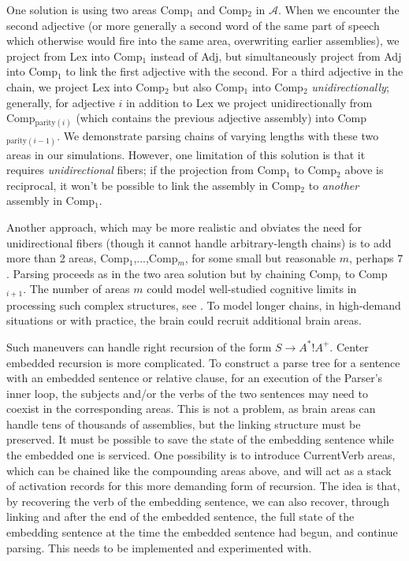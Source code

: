 \documentclass[11pt,a4paper]{article}
\begin{document}
One solution is using two areas {\sc Comp}$_1$ and {\sc Comp}$_2$ in $\mathcal{A}$. When we encounter the second adjective (or more generally a second word of the same part of speech which otherwise would fire into the same area, overwriting earlier assemblies), we project from {\sc Lex} into {\sc Comp}$_1$ instead of {\sc Adj}, but simultaneously project from {\sc Adj} into {\sc Comp}$_1$ to link the first adjective with the second. For a third adjective in the chain, we  project {\sc Lex} into {\sc Comp}$_2$ but also {\sc Comp}$_1$ into {\sc Comp}$_2$ {\em unidirectionally}; generally, for adjective $i$ in addition to {\sc Lex} we project unidirectionally from {\sc Comp}$_{\text{parity}(i)}$ (which contains the previous adjective assembly) into {\sc Comp}$_{\text{parity}(i-1)}$. We demonstrate parsing chains of varying lengths with these two areas in our simulations. However, one limitation of this solution is that it requires {\em unidirectional} fibers; if the projection from {\sc Comp}$_1$ to {\sc Comp}$_2$ above is reciprocal, it won't be possible to link the assembly in {\sc Comp}$_2$ to {\em another} assembly in {\sc Comp}$_1$.

Another approach, which may be more realistic and obviates the need for unidirectional fibers (though it cannot handle arbitrary-length chains) is to add more than 2 areas, {\sc Comp}$_1$,...,{\sc Comp}$_m$, for some small but reasonable $m$, perhaps $7$. Parsing proceeds as in the two area solution but by chaining {\sc Comp}$_i$ to {\sc Comp}$_{i+1}$. The number of areas $m$ could model well-studied cognitive limits in processing such complex structures, see \citet{GibsonEdward, karlsson}. To model longer chains, in high-demand situations or with practice, the brain could recruit additional brain areas.

Such maneuvers can handle right recursion of the form $S\rightarrow A^{*}!A^{+}$.  Center embedded recursion is more complicated. To construct a parse tree for a sentence with an embedded sentence or relative clause, for an execution of the Parser's inner loop, the subjects and/or the verbs of the two sentences may need to coexist in the corresponding areas.  This is not a problem, as brain areas can handle tens of thousands of assemblies, but the linking structure must be preserved.  It must be possible to save the state of the embedding sentence while the embedded one is serviced.  One possibility is to introduce {\sc CurrentVerb} areas, which can be chained like the compounding areas above, and will act as a stack of activation records for this more demanding form of recursion.  The idea is that, by recovering the verb of the embedding sentence, we can also recover, through linking and after the end of the embedded sentence, the full state of the embedding sentence at the time the embedded sentence had begun, and continue parsing.  This needs to be implemented and experimented with. 
\end{document}
